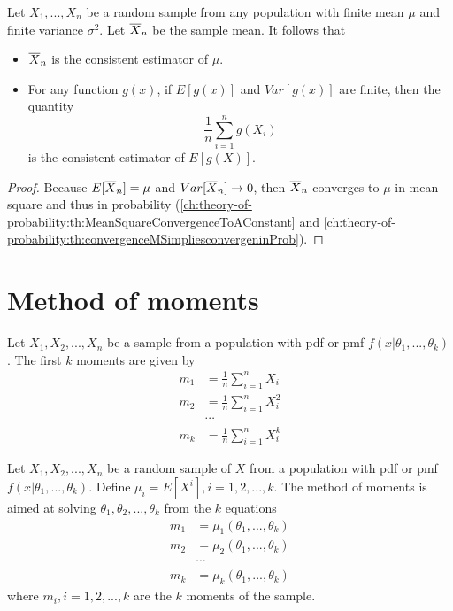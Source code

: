 \begin{refsection}
\begin{theorem}\cite[1160]{greene2017econometric}
Let $X_1,...,X_n$ be a random sample from any population with finite mean $\mu$ and finite variance $\sigma^2$. 
Let $\overline{X}_n$ be the sample mean. It follows that
\begin{itemize}
	\item $\overline{X}_n$ is the consistent estimator of $\mu$.
	\item For any function $g(x)$, if $E[g(x)]$ and $Var[g(x)]$ are finite, then the quantity
	$$\frac{1}{n}\sum_{i=1}^n g(X_i)$$
	is the consistent estimator of $E[g(X)]$.
\end{itemize}
\end{theorem}
\begin{proof}
Because $E[\overline{X}_n] = \mu$ and $Var[\overline{X}_n]\to 0$, then $\overline{X}_n$ converges to $\mu$ in mean square and thus in probability (\autoref{ch:theory-of-probability:th:MeanSquareConvergenceToAConstant} and \autoref{ch:theory-of-probability:th:convergenceMSimpliesconvergeninProb}).	
\end{proof}



\section{Method of moments}

\begin{definition}\cite[312]{casella2002statistical} Let $X_1,X_2,...,X_n$ be a sample from a population with pdf or pmf $f(x|\theta_1,...,\theta_k)$. The first $k$ moments are given by
	\begin{align*}
	m_1 &= \frac{1}{n}\sum_{i=1}^n X_i \\
	m_2 &= \frac{1}{n}\sum_{i=1}^n X_i^2 \\
	&\cdots \\
	m_k &= \frac{1}{n}\sum_{i=1}^n X_i^k 
	\end{align*}	
\end{definition}


\begin{definition}\cite[312]{casella2002statistical} Let $X_1,X_2,...,X_n$ be a random sample of $X$ from a population with pdf or pmf $f(x|\theta_1,...,\theta_k)$. Define $\mu_i = E[X^i],i=1,2,...,k$. The method of moments is aimed at solving $\theta_1,\theta_2,...,\theta_k$ from the $k$ equations
	\begin{align*}
	m_1 &= \mu_1(\theta_1,...,\theta_k) \\
	m_2 &= \mu_2(\theta_1,...,\theta_k) \\
	&\cdots \\
	m_k &= \mu_k(\theta_1,...,\theta_k) 
	\end{align*}
	where $m_i,i=1,2,...,k$ are the $k$ moments of the sample.			
\end{definition}



\end{refsection}
